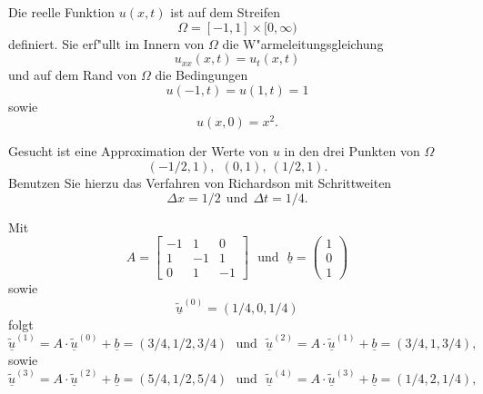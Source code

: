 Die reelle Funktion $u(x,t)$ ist auf dem Streifen
\[
\Omega = [-1, 1] \times [0,\infty)
\]
definiert. Sie erf"ullt im Innern von $\Omega$ die W"armeleitungsgleichung
\[
u_{xx}(x,t) = u_{t}(x,t)
\]
und auf dem Rand von $\Omega$ die Bedingungen
\[
u(-1,t) = u(1,t) = 1
\]
sowie
\[
u(x,0) = x^2. 
\]

Gesucht ist eine Approximation der Werte von $u$ in den drei Punkten von
$\Omega$
\[
(-1/2,1), \ \  (0,1), \ (1/2,1).
\]
Benutzen Sie hierzu das Verfahren von Richardson mit Schrittweiten
\[
\Delta x = 1/2 \ \ \text{und} \ \  \Delta t = 1/4.
\]

\begin{loesung}
Mit
\[
A = \left[\begin{array}{rrr} 
-1 & 1 & 0 \\
1 & -1 & 1 \\ 0 & 1 & -1 \end{array}\right] \ \ \ \text{und} \ \ \   \underline{b} =  \left(\begin{array}{r} 1 \\ 0 \\ 1 \end{array}\right)
\]
sowie
\[
\underline{\tilde u}^{(0)} = (1/4, 0, 1/4)
\]
folgt
\[
\underline{\tilde u}^{(1)} =  A \cdot \underline{\tilde u}^{(0)} + \underline{b} = (3/4, 1/2, 3/4) \ \ \ \text{und} \ \ \ \underline{\tilde u}^{(2)} =  A \cdot \underline{\tilde u}^{(1)} + \underline{b} = (3/4, 1, 3/4),
\]
sowie
\[
\underline{\tilde u}^{(3)} =  A \cdot \underline{\tilde u}^{(2)} + \underline{b} = (5/4, 1/2, 5/4) \ \ \ \text{und} \ \ \ \underline{\tilde u}^{(4)} =  A \cdot \underline{\tilde u}^{(3)} + \underline{b} = (1/4, 2, 1/4),
\]
\end{loesung}

